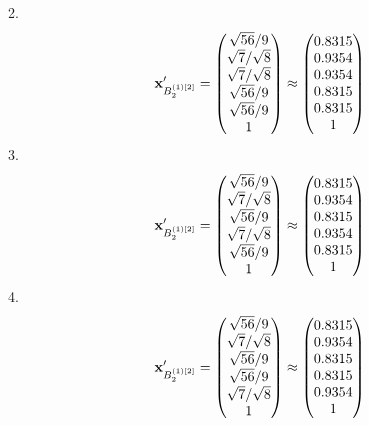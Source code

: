 \documentclass[10pt,a4paper]{article}
\begin{document}
	2.
	\[
		\bold{x}'_{B_2^{(1)[2]}} = 
		\begin{pmatrix}
			{\sqrt{56}} / {{9}} \\
			{\sqrt{7}} / {\sqrt{8}} \\
			{\sqrt{7}} / {\sqrt{8}} \\
			{\sqrt{56}} / {{9}} \\
			{\sqrt{56}} / {{9}} \\
			{1}{} \\
		\end{pmatrix}
		\approx
		\begin{pmatrix}
			0.8315   \\
			0.9354   \\
			0.9354   \\
			0.8315   \\
			0.8315   \\
			1        \\
		\end{pmatrix}
	\]
	3.
	\[
		\bold{x}'_{B_2^{(1)[2]}} = 
		\begin{pmatrix}
			{\sqrt{56}} / {{9}} \\
			{\sqrt{7}} / {\sqrt{8}} \\
			{\sqrt{56}} / {{9}} \\
			{\sqrt{7}} / {\sqrt{8}} \\
			{\sqrt{56}} / {{9}} \\
			{1}{} \\
		\end{pmatrix}
		\approx
		\begin{pmatrix}
			0.8315   \\
			0.9354   \\
			0.8315   \\
			0.9354   \\
			0.8315   \\
			1        \\
		\end{pmatrix}
	\]
	4.
	\[
		\bold{x}'_{B_2^{(1)[2]}} = 
		\begin{pmatrix}
			{\sqrt{56}} / {{9}} \\
			{\sqrt{7}} / {\sqrt{8}} \\
			{\sqrt{56}} / {{9}} \\
			{\sqrt{56}} / {{9}} \\
			{\sqrt{7}} / {\sqrt{8}} \\
			{1}{} \\
		\end{pmatrix}
		\approx
		\begin{pmatrix}
			0.8315   \\
			0.9354   \\
			0.8315   \\
			0.8315   \\
			0.9354   \\
			1        \\
		\end{pmatrix}
	\]
\end{document}
